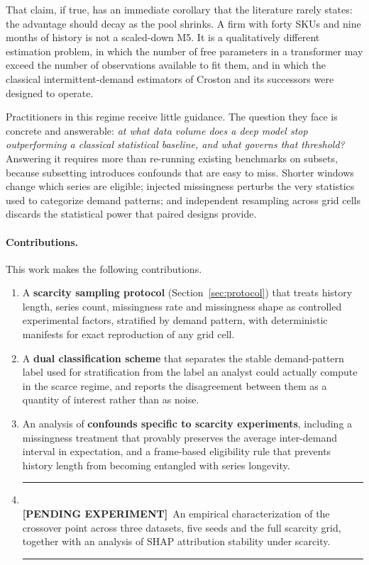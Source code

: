 \documentclass[11pt]{article}
\newcommand{\gap}[1]{%
  \par\vspace{0.6em}\noindent
  \colorbox{gapbg}{%
    \parbox{\dimexpr\linewidth-2\fboxsep}{%
      \color{gaprule}\rule{\linewidth}{0.8pt}\\[0.2em]
      \textcolor{gaprule}{\textbf{[PENDING EXPERIMENT]}}\ \color{black}#1\\[0.3em]
      \color{gaprule}\rule{\linewidth}{0.8pt}}}%
  \par\vspace{0.6em}}
\begin{document}
That claim, if true, has an immediate corollary that the literature rarely
states: the advantage should decay as the pool shrinks. A firm with forty SKUs
and nine months of history is not a scaled-down M5. It is a qualitatively
different estimation problem, in which the number of free parameters in a
transformer may exceed the number of observations available to fit them, and in
which the classical intermittent-demand estimators of Croston
\citep{croston1972} and its successors \citep{syntetos2005accuracy,teunter2011}
were designed to operate.

Practitioners in this regime receive little guidance. The question they face is
concrete and answerable: \emph{at what data volume does a deep model stop
outperforming a classical statistical baseline, and what governs that
threshold?} Answering it requires more than re-running existing benchmarks on
subsets, because subsetting introduces confounds that are easy to miss. Shorter
windows change which series are eligible; injected missingness perturbs the very
statistics used to categorize demand patterns; and independent resampling across
grid cells discards the statistical power that paired designs provide.

\paragraph{Contributions.} This work makes the following contributions.
\begin{enumerate}
  \item A \textbf{scarcity sampling protocol} (Section~\ref{sec:protocol}) that
    treats history length, series count, missingness rate and missingness shape
    as controlled experimental factors, stratified by demand pattern, with
    deterministic manifests for exact reproduction of any grid cell.
  \item A \textbf{dual classification scheme} that separates the stable
    demand-pattern label used for stratification from the label an analyst could
    actually compute in the scarce regime, and reports the disagreement between
    them as a quantity of interest rather than as noise.
  \item An analysis of \textbf{confounds specific to scarcity experiments},
    including a missingness treatment that provably preserves the average
    inter-demand interval in expectation, and a frame-based eligibility rule that
    prevents history length from becoming entangled with series longevity.
  \item \gap{An empirical characterization of the crossover point across three
    datasets, five seeds and the full scarcity grid, together with an analysis of
    SHAP attribution stability under scarcity.}
\end{enumerate}
\end{document}
